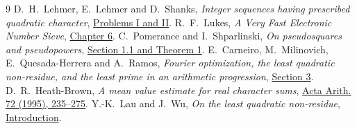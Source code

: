 \documentclass[11pt]{article}
\begin{document}
\begin{thebibliography}{9}\small
{} D.~H.~Lehmer, E.~Lehmer and D.~Shanks,
\emph{Integer sequences having prescribed quadratic character},
\href{https://oeis.org/A002189/a002189.pdf}{Problems I and II}.
 R.~F.~Lukes, \emph{A Very Fast Electronic Number Sieve},
\href{https://mspace.lib.umanitoba.ca/server/api/core/bitstreams/611cd835-b7d9-4b12-bc2a-aaf3f0576c04/content}{Chapter 6}.
 C.~Pomerance and I.~Shparlinski,
\emph{On pseudosquares and pseudopowers},
\href{https://math.dartmouth.edu/~carlp/PDF/pseudo3.pdf}{Section 1.1 and Theorem 1}.
 E.~Carneiro, M.~Milinovich, E.~Quesada-Herrera and A.~Ramos,
\emph{Fourier optimization, the least quadratic non-residue, and the least
prime in an arithmetic progression}, \href{https://arxiv.org/html/2404.08380v2#S3}{Section 3}.
 D.~R.~Heath-Brown, \emph{A mean value estimate for real
character sums}, \href{https://doi.org/10.4064/aa-72-3-235-275}{Acta Arith. 72 (1995), 235--275}.
 Y.-K.~Lau and J.~Wu, \emph{On the least quadratic non-residue},
\href{https://hkumath.hku.hk/~yklau/p/34.pdf}{Introduction}.
\end{thebibliography}
\end{document}
